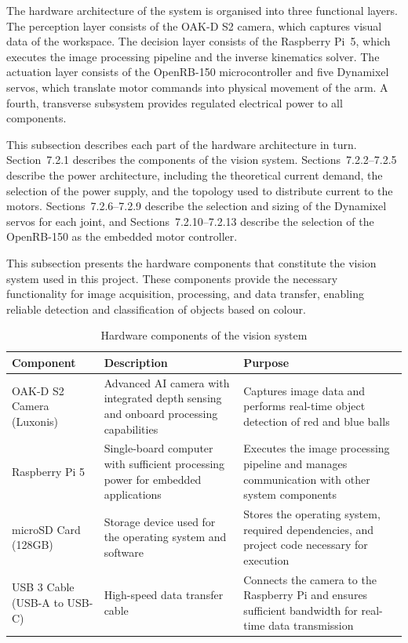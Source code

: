The hardware architecture of the system is organised into three 
functional layers. The perception layer consists of the OAK-D S2 
camera, which captures visual data of the workspace. The decision 
layer consists of the Raspberry Pi~5, which executes the image 
processing pipeline and the inverse kinematics solver. The actuation 
layer consists of the OpenRB-150 microcontroller and five Dynamixel 
servos, which translate motor commands into physical movement of 
the arm. A fourth, transverse subsystem provides regulated electrical 
power to all components.

This subsection describes each part of the hardware architecture in 
turn. Section~7.2.1 describes the components of the vision system. 
Sections~7.2.2--7.2.5 describe the power architecture, including 
the theoretical current demand, the selection of the power supply, 
and the topology used to distribute current to the motors. 
Sections~7.2.6--7.2.9 describe the selection and sizing of the 
Dynamixel servos for each joint, and Sections~7.2.10--7.2.13 
describe the selection of the OpenRB-150 as the embedded motor 
controller.




This subsection presents the hardware components that constitute the vision system used in
this project. These components provide the necessary functionality for image acquisition,
processing, and data transfer, enabling reliable detection and classification of objects based on
colour.

\begin{table}[htbp]
    \centering
    \renewcommand{\arraystretch}{1.3}
    \begin{tabular}{|p{2.3in}|p{2.1in}|p{2.1in}|}
        \hline
        \textbf{Component} & \textbf{Description} & \textbf{Purpose} \\
        \hline
        OAK-D S2 Camera (Luxonis) & 
        Advanced AI camera with integrated depth sensing and onboard processing capabilities &
        Captures image data and performs real-time object detection of red and blue balls \\
        \hline
        Raspberry Pi 5 & 
        Single-board computer with sufficient processing power for embedded applications &
        Executes the image processing pipeline and manages communication with other system components \\
        \hline
        microSD Card (128GB) & 
        Storage device used for the operating system and software &
        Stores the operating system, required dependencies, and project code necessary for execution \\
        \hline
        USB 3 Cable (USB-A to USB-C) & 
        High-speed data transfer cable &
        Connects the camera to the Raspberry Pi and ensures sufficient bandwidth for real-time data transmission \\
        \hline
    \end{tabular}
    \caption{Hardware components of the vision system}
    \label{tab:vision_hardware}
\end{table}

